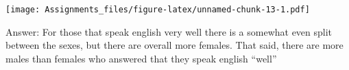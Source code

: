\documentclass[
]{article}
\newenvironment{Shaded}{\begin{snugshade}}{\end{snugshade}}
\newcommand{\DataTypeTok}[1]{\textcolor[rgb]{0.13,0.29,0.53}{#1}}
\newcommand{\KeywordTok}[1]{\textcolor[rgb]{0.13,0.29,0.53}{\textbf{#1}}}
\newcommand{\NormalTok}[1]{#1}
\newcommand{\OperatorTok}[1]{\textcolor[rgb]{0.81,0.36,0.00}{\textbf{#1}}}
\newcommand{\OtherTok}[1]{\textcolor[rgb]{0.56,0.35,0.01}{#1}}
\newcommand{\StringTok}[1]{\textcolor[rgb]{0.31,0.60,0.02}{#1}}
\begin{document}
\begin{Shaded}
\end{Shaded}

\texttt{[image: Assignments\_files/figure-latex/unnamed-chunk-13-1.pdf]}

Answer: For those that speak english very well there is a somewhat even
split between the sexes, but there are overall more females. That said,
there are more males than females who answered that they speak english
``well''
\end{document}
